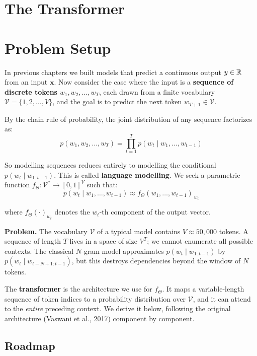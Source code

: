 \documentclass[main.tex]{subfiles}
\begin{document}
\section*{\Huge\textcolor{mantis}{The Transformer}}
\vspace{0.5cm}

\needspace{0.33\textheight}
\section{Problem Setup}

In previous chapters we built models that predict a continuous output $y \in \mathbb{R}$ from an input $\mathbf{x}$. Now consider the case where the input is a \textbf{sequence of discrete tokens} $w_1, w_2, \ldots, w_T$, each drawn from a finite vocabulary $\mathcal{V} = \{1, 2, \ldots, V\}$, and the goal is to predict the next token $w_{T+1} \in \mathcal{V}$.

By the chain rule of probability, the joint distribution of any sequence factorizes as:
$$p(w_1, w_2, \ldots, w_T) = \prod_{t=1}^{T} p(w_t \mid w_1, \ldots, w_{t-1})$$

So modelling sequences reduces entirely to modelling the conditional $p(w_t \mid w_{1:t-1})$. This is called \textbf{language modelling}. We seek a parametric function $f_\Theta : \mathcal{V}^{*} \to [0,1]^V$ such that:
$$p(w_t \mid w_1, \ldots, w_{t-1}) \approx f_\Theta(w_1, \ldots, w_{t-1})_{\,w_t}$$

where $f_\Theta(\cdot)_{w_t}$ denotes the $w_t$-th component of the output vector.

\textbf{Problem.} The vocabulary $\mathcal{V}$ of a typical model contains $V \approx 50{,}000$ tokens. A sequence of length $T$ lives in a space of size $V^T$; we cannot enumerate all possible contexts. The classical $N$-gram model approximates $p(w_t \mid w_{1:t-1})$ by $p(w_t \mid w_{t-N+1:t-1})$, but this destroys dependencies beyond the window of $N$ tokens.

The \textbf{transformer} is the architecture we use for $f_\Theta$. It maps a variable-length sequence of token indices to a probability distribution over $\mathcal{V}$, and it can attend to the \textit{entire} preceding context. We derive it below, following the original architecture (Vaswani et al., 2017) component by component.

\subsection{Roadmap}
\end{document}
